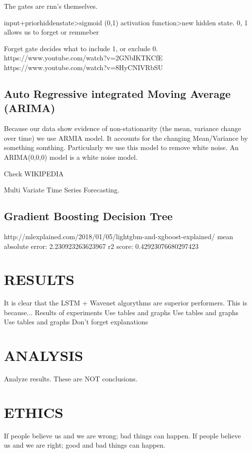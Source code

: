\documentclass[]{llncs}
\begin{document}
The gates are rnn's themselves.

input+priorhiddenstate>sigmoid (0,1) activation function>new hidden state. 0, 1 allows us to forget or remmeber 

Forget gate decides what to include 1, or exclude 0. 
https://www.youtube.com/watch?v=2GNbIKTKCfE
https://www.youtube.com/watch?v=8HyCNIVRbSU

\subsection{Auto Regressive integrated Moving Average (ARIMA)}
Because our data show evidence of non-stationarity (the mean, variance change over time) we use ARMIA model. It accounts for the changing Mean/Variance by something somthing.
Particularly we use this model to remove white noise. An ARIMA(0,0,0) model is a white noise model.

Check WIKIPEDIA

Multi Variate Time Series Forecasting.

\subsection{Gradient Boosting Decision Tree}
http://mlexplained.com/2018/01/05/lightgbm-and-xgboost-explained/
mean absolute error: 2.230923263623967
r2 score: 0.42923076680297423


\section{RESULTS}

It is clear that the LSTM + Wavenet algorythms are superior performers.
This is because...
Results of experiments
Use tables and graphs
Use tables and graphs
Use tables and graphs
Don't forget explanations
\section{ANALYSIS}
Analyze results.
These are NOT conclusions.
\section{ETHICS}
If people believe us and we are wrong; bad things can happen. If people believe us and we are right; good and bad things can happen.
\end{document}

